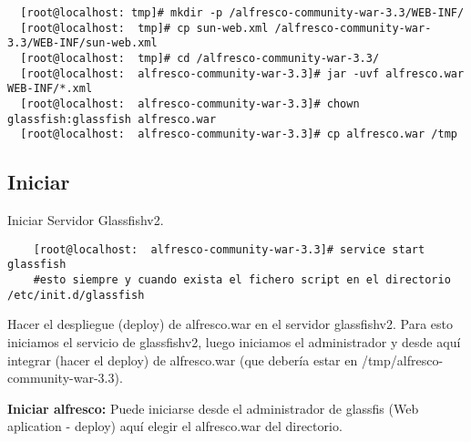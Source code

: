     \lstset{language=sh}
    \begin{lstlisting}
  [root@localhost: tmp]# mkdir -p /alfresco-community-war-3.3/WEB-INF/
  [root@localhost:  tmp]# cp sun-web.xml /alfresco-community-war-3.3/WEB-INF/sun-web.xml
  [root@localhost:  tmp]# cd /alfresco-community-war-3.3/
  [root@localhost:  alfresco-community-war-3.3]# jar -uvf alfresco.war WEB-INF/*.xml
  [root@localhost:  alfresco-community-war-3.3]# chown glassfish:glassfish alfresco.war
  [root@localhost:  alfresco-community-war-3.3]# cp alfresco.war /tmp
    \end{lstlisting}


\subsection{Iniciar}
Iniciar Servidor Glassfishv2.\newline

    \lstset{language=sh}
    \begin{lstlisting}
	[root@localhost:  alfresco-community-war-3.3]# service start glassfish 
	#esto siempre y cuando exista el fichero script en el directorio /etc/init.d/glassfish
    \end{lstlisting}

Hacer el despliegue (deploy) de alfresco.war en el servidor glassfishv2. Para esto iniciamos el servicio de glassfishv2, luego iniciamos el administrador y desde aquí integrar (hacer el deploy) de alfresco.war (que debería estar en /tmp/alfresco-community-war-3.3). \newline

\textbf{Iniciar alfresco: }Puede iniciarse desde el administrador de glassfis (Web aplication - deploy) aquí elegir el 	alfresco.war del directorio.


